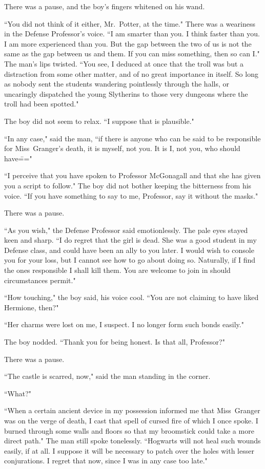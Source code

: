 There was a pause, and the boy's fingers whitened on his wand.

``You did not think of it either, Mr.~Potter, at the time." There was a weariness in the Defense Professor's voice. ``I am smarter than you. I think faster than you. I am more experienced than you. But the gap between the two of us is not the same as the gap between us and them. If you can miss something, then so can I." The man's lips twisted. ``You see, I deduced at once that the troll was but a distraction from some other matter, and of no great importance in itself. So long as nobody sent the students wandering pointlessly through the halls, or uncaringly dispatched the young Slytherins to those very dungeons where the troll had been spotted."

The boy did not seem to relax. ``I suppose that is plausible."

``In any case," said the man, ``if there is anyone who can be said to be responsible for Miss~Granger's death, it is myself, not you. It is I, not you, who should have\==="

``I perceive that you have spoken to Professor McGonagall and that she has given you a script to follow." The boy did not bother keeping the bitterness from his voice. ``If you have something to say to me, Professor, say it without the masks."

There was a pause.

``As you wish," the Defense Professor said emotionlessly. The pale eyes stayed keen and sharp. ``I do regret that the girl is dead. She was a good student in my Defense class, and could have been an ally to you later. I would wish to console you for your loss, but I cannot see how to go about doing so. Naturally, if I find the ones responsible I shall kill them. You are welcome to join in should circumstances permit."

``How touching," the boy said, his voice cool. ``You are not claiming to have liked Hermione, then?"

``Her charms were lost on me, I suspect. I no longer form such bonds easily."

The boy nodded. ``Thank you for being honest. Is that all, Professor?"

There was a pause.

``The castle is scarred, now," said the man standing in the corner.

``What?"

``When a certain ancient device in my possession informed me that Miss~Granger was on the verge of death, I cast that spell of cursed fire of which I once spoke. I burned through some walls and floors so that my broomstick could take a more direct path." The man still spoke tonelessly. ``Hogwarts will not heal such wounds easily, if at all. I suppose it will be necessary to patch over the holes with lesser conjurations. I regret that now, since I was in any case too late."


